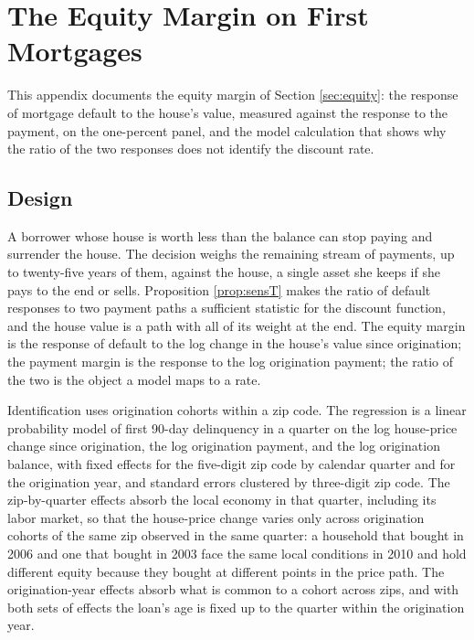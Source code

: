 \section{The Equity Margin on First Mortgages}\label{appendix:equity}

This appendix documents the equity margin of Section \ref{sec:equity}: the response of mortgage default to the house's value, measured against the response to the payment, on the one-percent panel, and the model calculation that shows why the ratio of the two responses does not identify the discount rate.

\subsection{Design}

A borrower whose house is worth less than the balance can stop paying and surrender the house. The decision weighs the remaining stream of payments, up to twenty-five years of them, against the house, a single asset she keeps if she pays to the end or sells. Proposition \ref{prop:sensT} makes the ratio of default responses to two payment paths a sufficient statistic for the discount function, and the house value is a path with all of its weight at the end. The equity margin is the response of default to the log change in the house's value since origination; the payment margin is the response to the log origination payment; the ratio of the two is the object a model maps to a rate.

Identification uses origination cohorts within a zip code. The regression is a linear probability model of first 90-day delinquency in a quarter on the log house-price change since origination, the log origination payment, and the log origination balance, with fixed effects for the five-digit zip code by calendar quarter and for the origination year, and standard errors clustered by three-digit zip code. The zip-by-quarter effects absorb the local economy in that quarter, including its labor market, so that the house-price change varies only across origination cohorts of the same zip observed in the same quarter: a household that bought in 2006 and one that bought in 2003 face the same local conditions in 2010 and hold different equity because they bought at different points in the price path. The origination-year effects absorb what is common to a cohort across zips, and with both sets of effects the loan's age is fixed up to the quarter within the origination year.

